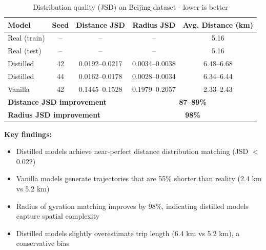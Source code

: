 \begin{table}[h]
    \centering
    \caption{Distribution quality (JSD) on Beijing dataset - lower is better}
    \label{tab:jsd-results}
    \small
    \begin{tabular}{lcccc}
        \toprule
        \textbf{Model}                                        & \textbf{Seed}                         & \textbf{Distance JSD} & \textbf{Radius JSD} & \textbf{Avg. Distance (km)} \\
        \midrule
        Real (train)                                          & --                                    & --                    & --                  & 5.16                        \\
        Real (test)                                           & --                                    & --                    & --                  & 5.16                        \\
        \midrule
        Distilled                                             & 42                                    & 0.0192--0.0217        & 0.0034--0.0038      & 6.48--6.68                  \\
        Distilled                                             & 44                                    & 0.0162--0.0178        & 0.0028--0.0034      & 6.34--6.44                  \\
        Vanilla                                               & 42                                    & 0.1445--0.1528        & 0.1979--0.2057      & 2.33--2.43                  \\
        \midrule
        \multicolumn{3}{l}{\textbf{Distance JSD improvement}} & \multicolumn{2}{c}{\textbf{87--89\%}}                                                                             \\
        \multicolumn{3}{l}{\textbf{Radius JSD improvement}}   & \multicolumn{2}{c}{\textbf{98\%}}                                                                                 \\
        \bottomrule
    \end{tabular}
\end{table}

\textbf{Key findings:}
\begin{itemize}[noitemsep,topsep=0pt]
    \item Distilled models achieve near-perfect distance distribution matching (JSD $<$ 0.022)
    \item Vanilla models generate trajectories that are 55\% shorter than reality (2.4 km vs 5.2 km)
    \item Radius of gyration matching improves by 98\%, indicating distilled models capture spatial complexity
    \item Distilled models slightly overestimate trip length (6.4 km vs 5.2 km), a conservative bias
\end{itemize}

